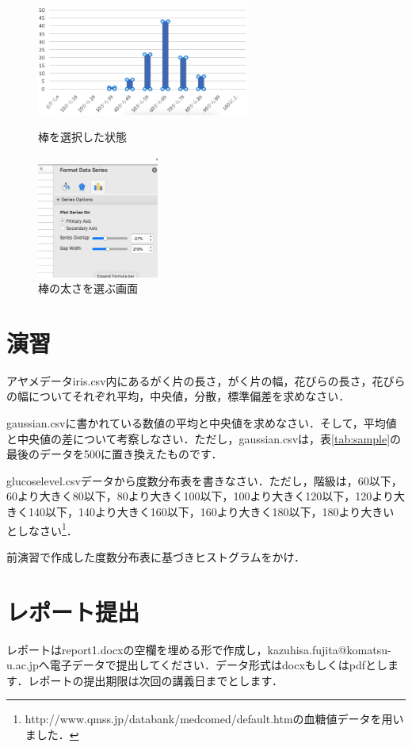 \begin{figure}[htbp]
    \begin{minipage}{0.5\hsize}
        \centering
        \includegraphics[width=7cm]{chap1/select_bar_hist.png}
        \caption{棒を選択した状態}
        \label{fig:select_bar_hist}
    \end{minipage}
    \begin{minipage}{0.5\hsize}
        \centering
        \includegraphics[width=4cm]{chap1/select_width_hist.png}
        \caption{棒の太さを選ぶ画面}
        \label{fig:select_width_hist}
    \end{minipage}
\end{figure}


\section{演習}

\practice
アヤメデータiris.csv内にあるがく片の長さ，がく片の幅，花びらの長さ，花びらの幅についてそれぞれ平均，中央値，分散，標準偏差を求めなさい．

\practice
gaussian.csvに書かれている数値の平均と中央値を求めなさい．そして，平均値と中央値の差について考察しなさい．ただし，gaussian.csvは，表\ref{tab:sample}の最後のデータを500に置き換えたものです．

\practice
glucoselevel.csvデータから度数分布表を書きなさい．ただし，階級は，60以下，60より大きく80以下，80より大きく100以下，100より大きく120以下，120より大きく140以下，140より大きく160以下，160より大きく180以下，180より大きい としなさい\footnote{http://www.qmss.jp/databank/medcomed/default.htmの血糖値データを用いました．}．

\practice
 前演習で作成した度数分布表に基づきヒストグラムをかけ．

\section{レポート提出}

レポートはreport1.docxの空欄を埋める形で作成し，kazuhisa.fujita@komatsu-u.ac.jpへ電子データで提出してください．データ形式はdocxもしくはpdfとします．レポートの提出期限は次回の講義日までとします．
